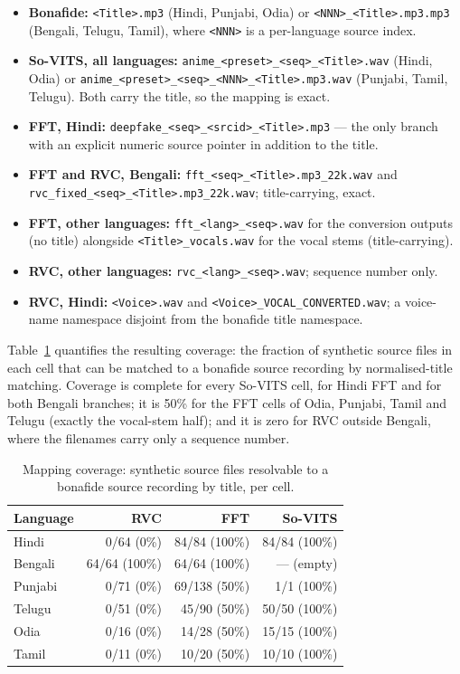 \documentclass[conference]{IEEEtran}
\begin{document}
\begin{itemize}
  \item \textbf{Bonafide:} \texttt{<Title>.mp3} (Hindi, Punjabi, Odia) or
        \texttt{<NNN>\_<Title>.mp3.mp3} (Bengali, Telugu, Tamil), where \texttt{<NNN>} is
        a per-language source index.
  \item \textbf{So-VITS, all languages:}
        \texttt{anime\_<preset>\_<seq>\_<Title>.wav} (Hindi, Odia) or
        \texttt{anime\_<preset>\_<seq>\_<NNN>\_<Title>.mp3.wav} (Punjabi, Tamil,
        Telugu). Both carry the title, so the mapping is exact.
  \item \textbf{FFT, Hindi:} \texttt{deepfake\_<seq>\_<srcid>\_<Title>.mp3} --- the only
        branch with an explicit numeric source pointer in addition to the title.
  \item \textbf{FFT and RVC, Bengali:} \texttt{fft\_<seq>\_<Title>.mp3\_22k.wav} and
        \texttt{rvc\_fixed\_<seq>\_<Title>.mp3\_22k.wav}; title-carrying, exact.
  \item \textbf{FFT, other languages:} \texttt{fft\_<lang>\_<seq>.wav} for the conversion
        outputs (no title) alongside \texttt{<Title>\_vocals.wav} for the vocal stems
        (title-carrying).
  \item \textbf{RVC, other languages:} \texttt{rvc\_<lang>\_<seq>.wav}; sequence number
        only.
  \item \textbf{RVC, Hindi:} \texttt{<Voice>.wav} and
        \texttt{<Voice>\_VOCAL\_CONVERTED.wav}; a voice-name namespace disjoint from the
        bonafide title namespace.
\end{itemize}

Table~\ref{tab:s8} quantifies the resulting coverage: the fraction of synthetic source
files in each cell that can be matched to a bonafide source recording by
normalised-title matching. Coverage is complete for every So-VITS cell, for Hindi FFT and
for both Bengali branches; it is 50\% for the FFT cells of Odia, Punjabi, Tamil and
Telugu (exactly the vocal-stem half); and it is zero for RVC outside Bengali, where the
filenames carry only a sequence number.

\begin{table}[t]
\centering
\caption{Mapping coverage: synthetic source files resolvable to a bonafide source
recording by title, per cell.}
\label{tab:s8}
\footnotesize
\setlength{\tabcolsep}{4pt}
\begin{tabular}{lrrr}
\toprule
\textbf{Language} & \textbf{RVC} & \textbf{FFT} & \textbf{So-VITS} \\
\midrule
Hindi   & 0/64 (0\%)   & 84/84 (100\%)  & 84/84 (100\%) \\
Bengali & 64/64 (100\%)& 64/64 (100\%)  & --- (empty) \\
Punjabi & 0/71 (0\%)   & 69/138 (50\%)  & 1/1 (100\%) \\
Telugu  & 0/51 (0\%)   & 45/90 (50\%)   & 50/50 (100\%) \\
Odia    & 0/16 (0\%)   & 14/28 (50\%)   & 15/15 (100\%) \\
Tamil   & 0/11 (0\%)   & 10/20 (50\%)   & 10/10 (100\%) \\
\bottomrule
\end{tabular}
\end{table}
\end{document}
